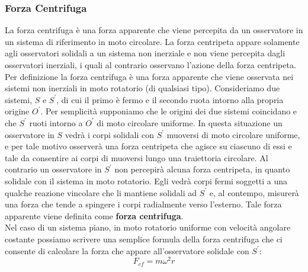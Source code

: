 \documentclass[a4paper,12pt, oneside]{book}
\begin{document}
\subsubsection{Forza Centrifuga}
La forza centrifuga è una forza apparente che viene percepita da un osservatore in un sistema di riferimento in moto circolare. La forza centripeta appare solamente agli osservatori solidali a un sistema non inerziale e non viene percepita dagli osservatori inerziali, i quali al contrario osservano l'azione della forza centripeta. Per definizione la forza centrifuga è una forza apparente che viene osservata nei sistemi non inerziali in moto rotatorio (di qualsiasi tipo). Consideriamo due sistemi, $S$ e $S^{'}$, di cui il primo è fermo e il secondo ruota intorno alla propria origine  $O^{'}$. Per semplicità supponiamo che le origini dei due sistemi coincidano e che $S^{'}$ ruoti intorno a $O^{'}$ di moto circolare uniforme. In questa situazione un osservatore in $S$ vedrà i corpi solidali con $S^{'}$ muoversi di moto circolare uniforme, e per tale motivo osserverà una forza centripeta che agisce su ciascuno di essi e tale da consentire ai corpi di muoversi lungo una traiettoria circolare. Al contrario un osservatore in $S^{'}$ non percepirà alcuna forza centripeta, in quanto solidale con il sistema in moto rotatorio. Egli vedrà corpi fermi soggetti a una qualche reazione vincolare che li mantiene solidali ad $S^{'}$ e, al contempo, misurerà una forza che tende a spingere i corpi radialmente verso l'esterno. Tale forza apparente viene definita come \textbf{forza centrifuga}.
\\ Nel caso di un sistema piano, in moto rotatorio uniforme con velocità angolare costante possiamo scrivere una semplice formula della forza centrifuga che ci consente di calcolare la forza che appare all'osservatore solidale con $S^{'}$:
$$F_{cf}=m\omega^2 r$$
\end{document}
